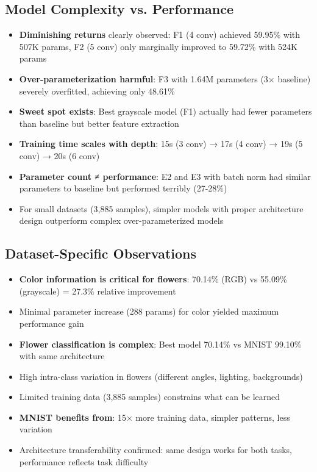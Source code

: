 \documentclass[12pt,a4paper]{article}
\begin{document}
\subsection{Model Complexity vs. Performance}
\begin{itemize}
    \item \textbf{Diminishing returns} clearly observed: F1 (4 conv) achieved 59.95\% with 507K params, F2 (5 conv) only marginally improved to 59.72\% with 524K params
    \item \textbf{Over-parameterization harmful}: F3 with 1.64M parameters (3× baseline) severely overfitted, achieving only 48.61\%
    \item \textbf{Sweet spot exists}: Best grayscale model (F1) actually had fewer parameters than baseline but better feature extraction
    \item \textbf{Training time scales with depth}: 15s (3 conv) → 17s (4 conv) → 19s (5 conv) → 20s (6 conv)
    \item \textbf{Parameter count ≠ performance}: E2 and E3 with batch norm had similar parameters to baseline but performed terribly (27-28\%)
    \item For small datasets (3,885 samples), simpler models with proper architecture design outperform complex over-parameterized models
\end{itemize}

\subsection{Dataset-Specific Observations}
\begin{itemize}
    \item \textbf{Color information is critical for flowers}: 70.14\% (RGB) vs 55.09\% (grayscale) = 27.3\% relative improvement
    \item Minimal parameter increase (288 params) for color yielded maximum performance gain
    \item \textbf{Flower classification is complex}: Best model 70.14\% vs MNIST 99.10\% with same architecture
    \item High intra-class variation in flowers (different angles, lighting, backgrounds)
    \item Limited training data (3,885 samples) constrains what can be learned
    \item \textbf{MNIST benefits from}: 15× more training data, simpler patterns, less variation
    \item Architecture transferability confirmed: same design works for both tasks, performance reflects task difficulty
\end{itemize}
\end{document}
